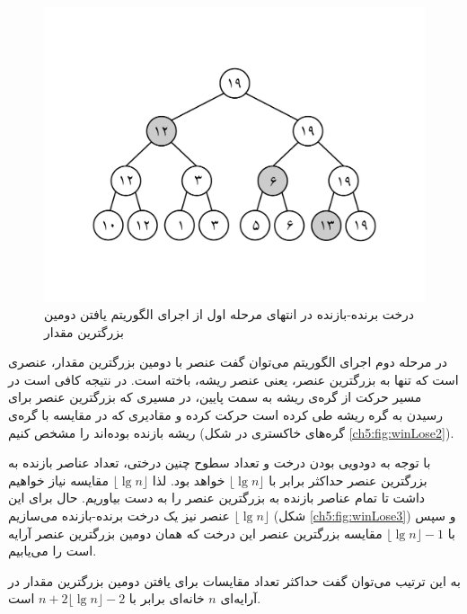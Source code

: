 \begin{figure}
\begin{center}
\includegraphics[scale=0.36]{figs/ch5/winner_loser_tree_2.pdf}
\caption{درخت برنده-بازنده در انتهای مرحله اول از اجرای الگوریتم یافتن دومین بزرگترین مقدار}
\label{ch5:fig:winLose2}
\end{center}
\end{figure}

در مرحله دوم اجرای الگوریتم می‌توان گفت عنصر با دومین بزرگترین مقدار، عنصری است که تنها به بزرگترین عنصر، یعنی عنصر ریشه، باخته است. در نتیجه کافی است در مسیر حرکت از گره‌ی ریشه به سمت پایین، در مسیری که بزرگترین عنصر برای رسیدن به گره ریشه طی کرده است حرکت کرده و مقادیری که در مقایسه با گره‌ی ریشه بازنده بوده‌اند را مشخص کنیم (گره‌های خاکستری در شکل  {\eqref{ch5:fig:winLose2}}). 

با توجه به دودویی بودن درخت و تعداد سطوح چنین درختی، تعداد عناصر بازنده به بزرگترین عنصر حداکثر برابر با {$\lfloor\lg n\rfloor$} خواهد بود. لذا {$\lfloor\lg n\rfloor$} مقایسه نیاز خواهیم داشت تا تمام عناصر بازنده به بزرگترین عنصر را به دست بیاوریم. حال برای این
{$\lfloor\lg n\rfloor$} عنصر نیز یک درخت برنده-بازنده می‌سازیم (شکل {\eqref{ch5:fig:winLose3}}) و سپس با {$\lfloor\lg n\rfloor - 1$} مقایسه بزرگترین عنصر این درخت که همان دومین بزرگترین عنصر آرایه است را می‌یابیم. 

به این ترتیب می‌توان گفت حداکثر تعداد مقایسات برای یافتن دومین بزرگترین مقدار در آرایه‌ای {$n$} خانه‌ای برابر با {$n+2\lfloor\lg n\rfloor - 2$} است.

